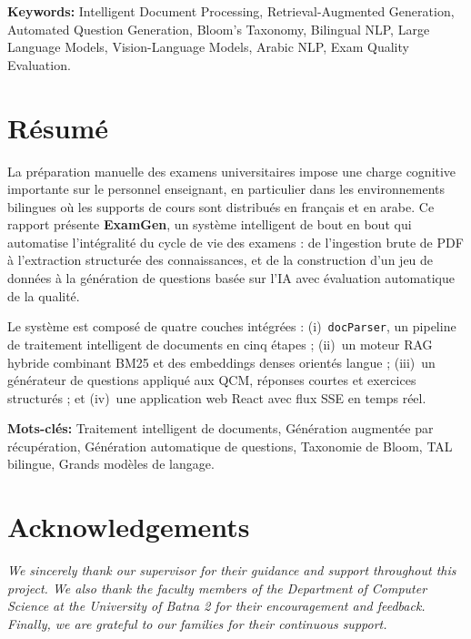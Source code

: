\documentclass[12pt, a4paper]{article}
\begin{document}
\vspace{0.5cm}
\noindent\textbf{Keywords:} Intelligent Document Processing, Retrieval-Augmented
Generation, Automated Question Generation, Bloom's Taxonomy, Bilingual NLP, Large
Language Models, Vision-Language Models, Arabic NLP, Exam Quality Evaluation.

\newpage
\section*{R\'esum\'e}

La pr\'eparation manuelle des examens universitaires impose une charge cognitive
importante sur le personnel enseignant, en particulier dans les environnements
bilingues o\`u les supports de cours sont distribu\'es en fran\c cais et en arabe.
Ce rapport pr\'esente \textbf{ExamGen}, un syst\`eme intelligent de bout en bout
qui automatise l'int\'egralit\'e du cycle de vie des examens : de l'ingestion brute
de PDF \`a l'extraction structur\'ee des connaissances, et de la construction d'un
jeu de donn\'ees \`a la g\'en\'eration de questions bas\'ee sur l'IA avec \'evaluation
automatique de la qualit\'e.

Le syst\`eme est compos\'e de quatre couches int\'egr\'ees : (i)~\texttt{docParser},
un pipeline de traitement intelligent de documents en cinq \'etapes ; (ii)~un moteur
RAG hybride combinant BM25 et des embeddings denses orient\'es langue ; (iii)~un
g\'en\'erateur de questions appliqu\'e aux QCM, r\'eponses courtes et exercices
structur\'es ; et (iv)~une application web React avec flux SSE en temps r\'eel.

\vspace{0.3cm}
\noindent\textbf{Mots-cl\'es:} Traitement intelligent de documents, G\'en\'eration
augment\'ee par r\'ecup\'eration, G\'en\'eration automatique de questions, Taxonomie
de Bloom, TAL bilingue, Grands mod\`eles de langage.

\newpage
\section*{Acknowledgements}

\begin{center}
\textit{We sincerely thank our supervisor for their guidance and support throughout
this project. We also thank the faculty members of the Department of Computer Science
at the University of Batna 2 for their encouragement and feedback. Finally, we are
grateful to our families for their continuous support.}
\end{center}
\end{document}
